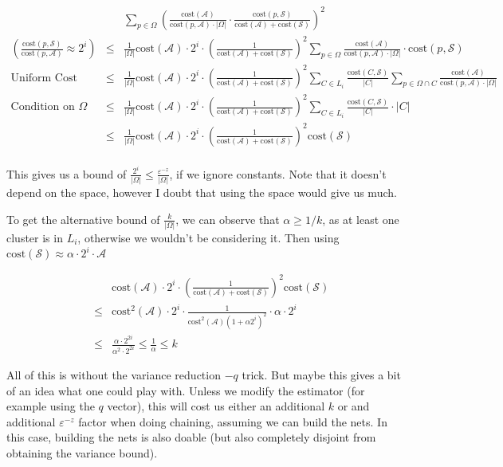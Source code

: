 \documentclass{article}
\newcommand{\cost}{\text{cost}}
\newcommand{\calS}{\mathcal{S}}
\newcommand{\greedy}{\mathcal{A}}
\newcommand{\coreset}{\Omega}
\begin{document}
\begin{eqnarray*}
& & \sum_{p\in \Omega} \left(\frac{\cost(\greedy)}{\cost(p,\greedy)\cdot |\coreset|}\cdot\frac{\cost(p,\calS)}{\cost(\greedy)+\cost(\calS)}\right)^2 \\
\left(\frac{\cost(p,\calS)}{\cost(p,\greedy)}\approx 2^i\right)& \leq & \frac{1}{|\coreset|}\cost(\greedy)\cdot 2^i \cdot\left(\frac{1}{\cost(\greedy)+\cost(\calS)}\right)^2 \sum_{p\in \Omega} \frac{\cost(\greedy)}{\cost(p,\greedy)\cdot |\coreset|}\cdot\cost(p,\calS) \\
\text{Uniform Cost}& \leq & \frac{1}{|\coreset|}\cost(\greedy)\cdot 2^i \cdot\left(\frac{1}{\cost(\greedy)+\cost(\calS)}\right)^2 \sum_{C\in L_i}\frac{\cost(C,\calS)}{|C|}\sum_{p\in\Omega \cap C} \frac{\cost(\greedy)}{\cost(p,\greedy)\cdot |\coreset|} \\
\text{Condition on }\coreset& \leq & \frac{1}{|\coreset|}\cost(\greedy)\cdot 2^i \cdot\left(\frac{1}{\cost(\greedy)+\cost(\calS)}\right)^2 \sum_{C\in L_i}\frac{\cost(C,\calS)}{|C|}\cdot |C|\\
& \leq & \frac{1}{|\coreset|}\cost(\greedy)\cdot 2^i \cdot\left(\frac{1}{\cost(\greedy)+\cost(\calS)}\right)^2 \cost(\calS)\\
\end{eqnarray*}

This gives us a bound of $\frac{2^i}{|\coreset|}\leq \frac{\varepsilon^{-z}}{|\coreset|}$, if we ignore constants. Note that it doesn't depend on the space, however I doubt that using the space would give us much.

To get the alternative bound of $\frac{k}{|\coreset|}$, we can observe that $\alpha\geq 1/k$, as at least one cluster is in $L_i$, otherwise we wouldn't be considering it. Then using $\cost(\calS) \approx \alpha\cdot 2^i\cdot \greedy$

\begin{eqnarray*}
& &\cost(\greedy)\cdot 2^i \cdot\left(\frac{1}{\cost(\greedy)+\cost(\calS)}\right)^2 \cost(\calS) \\
&\leq & \cost^2(\greedy)\cdot 2^i \cdot\frac{1}{\cost^2(\greedy)(1+\alpha 2^i)^2} \cdot \alpha\cdot 2^i \\
&\leq &  \frac{\alpha \cdot2^{2i}}{\alpha^2 \cdot 2^{2i}} \leq  \frac{1}{\alpha} \leq k
\end{eqnarray*}

All of this is without the variance reduction $-q$ trick. But maybe this gives a bit of an idea what one could play with. Unless we modify the estimator (for example using the $q$ vector), this will cost us either an additional $k$ or and additional $\varepsilon^{-z}$ factor when doing chaining, assuming we can build the nets. In this case, building the nets is also doable (but also completely disjoint from obtaining the variance bound). 
\end{document}
